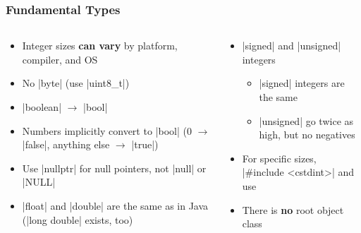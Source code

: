 \documentclass[glossy]{beamer}
\begin{document}
\begin{frame}[fragile=singleslide]
  \frametitle{Fundamental Types}
  \begin{columns}[t]
    \begin{column}{6cm}
      \begin{itemize}
        \item Integer sizes \textbf{can vary} by platform, compiler, and OS
        \item No \javainline|byte| (use \cppinline|uint8_t|)
        \item \javainline|boolean| $\rightarrow$ \cppinline|bool|
        \item Numbers implicitly convert to \cppinline|bool| (0 $\rightarrow$ \javainline|false|, anything else $\rightarrow$ \javainline|true|)
        \item Use \cppinline|nullptr| for null pointers, not \javainline|null| or \cppinline|NULL|
        \item \cppinline|float| and \cppinline|double| are the same as in Java (\cppinline|long double| exists, too)
      \end{itemize}
    \end{column}

    \begin{column}{6cm}
      \begin{itemize}
        \item \cppinline|signed| and \cppinline|unsigned| integers
        \begin{itemize}
          \item \cppinline|signed| integers are the same
          \item \cppinline|unsigned| go twice as high, but no negatives
        \end{itemize}
        \item For specific sizes, \cppinline|#include <cstdint>| and use 
        \item There is \textbf{no} root object class
      \end{itemize}
    \end{column}
  \end{columns}
\end{frame}
\end{document}
